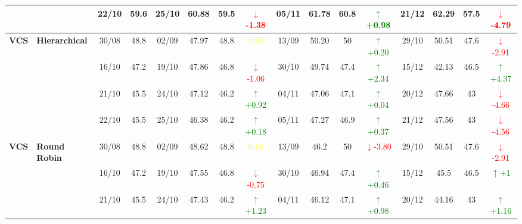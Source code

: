 \documentclass{ieeeaccess}
\begin{document}
{\begin{longtable}{llcc|cccc|cccc|cccc}
&
& 22/10 & 59.6 & 25/10 & 60.88 & 59.5 & \textcolor{red}{\(\downarrow\)-1.38} & 05/11 & 61.78 & 60.8 & \textcolor{green}{\(\uparrow\)+0.98} & 21/12 & 62.29 & 57.5 & \textcolor{red}{\(\downarrow\)-4.79} \\
\midrule



\multirow{4}{*}{\textbf{VCS}} 
& \textbf{Hierarchical}
& 30/08 & 48.8 & 02/09 & 47.97 & 48.8 & \textcolor{yellow}{0.83} & 13/09 & 50.20 & 50 & \textcolor{green}{\(\uparrow\)+0.20} & 29/10 & 50.51 & 47.6 & \textcolor{red}{\(\downarrow\)-2.91} \\

&
& 16/10 & 47.2 & 19/10 & 47.86 & 46.8 & \textcolor{red}{\(\downarrow\)-1.06} & 30/10 & 49.74 & 47.4 & \textcolor{green}{\(\uparrow\)+2.34} & 15/12 & 42.13 & 46.5 & \textcolor{green}{\(\uparrow\)+4.37} \\

&
& 21/10 & 45.5 & 24/10 & 47.12 & 46.2 & \textcolor{green}{\(\uparrow\)+0.92} & 04/11 & 47.06 & 47.1 & \textcolor{green}{\(\uparrow\)+0.04} & 20/12 & 47.66 & 43 & \textcolor{red}{\(\downarrow\)-4.66} \\

&
& 22/10 & 45.5 & 25/10 & 46.38 & 46.2 & \textcolor{green}{\(\uparrow\)+0.18} & 05/11 & 47.27 & 46.9 & \textcolor{green}{\(\uparrow\)+0.37} & 21/12 & 47.56 & 43 & \textcolor{red}{\(\downarrow\)-4.56} \\
\midrule


\multirow{4}{*}{\textbf{VCS}} 
& \textbf{Round Robin}
& 30/08 & 48.8 & 02/09 & 48.62 & 48.8 & \textcolor{yellow}{0.18} & 13/09 & 46.2 & 50 & \textcolor{red}{\(\downarrow\)-3.80} & 29/10 & 50.51 & 47.6 & \textcolor{red}{\(\downarrow\)-2.91} \\

&
& 16/10 & 47.2 & 19/10 & 47.55 & 46.8 & \textcolor{red}{\(\downarrow\)-0.75} & 30/10 & 46.94 & 47.4 & \textcolor{green}{\(\uparrow\)+0.46} & 15/12 & 45.5 & 46.5 & \textcolor{green}{\(\uparrow\)+1} \\

&
& 21/10 & 45.5 & 24/10 & 47.43 & 46.2 & \textcolor{green}{\(\uparrow\)+1.23} & 04/11 & 46.12 & 47.1 & \textcolor{green}{\(\uparrow\)+0.98} & 20/12 & 44.16 & 43 & \textcolor{green}{\(\uparrow\)+1.16} \\


\end{longtable}}
\end{document}
